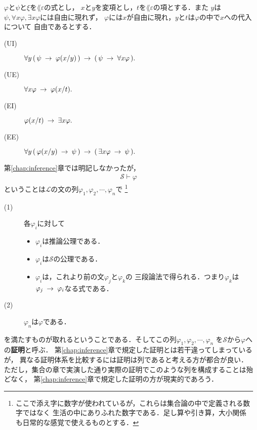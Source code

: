 	\begin{screen}
		\begin{logicalaxm}[{\bf HK}の公理(量化)]
			$\varphi$と$\psi$と$\xi$を$\lang{\varepsilon}$の式とし，
			$x$と$y$を変項とし，$t$を$\lang{\varepsilon}$の項とする．また
			$y$は$\psi,\forall x \varphi, \exists x \varphi$には自由に現れず，
			$\varphi$には$x$が自由に現れ，$y$と$t$は$\varphi$の中で$x$への代入について
			自由であるとする．
			\begin{description}
				\item[(UI)] $\forall y\, (\, \psi \hspace{0.25em}\rightarrow\hspace{0.25em} \varphi(x/y)\, ) 
					\hspace{0.25em}\rightarrow\hspace{0.25em} (\, \psi \hspace{0.25em}\rightarrow\hspace{0.25em} \forall x \varphi\, ).$
				
				\item[(UE)] $\forall x \varphi \hspace{0.25em}\rightarrow\hspace{0.25em} \varphi(x/t).$
				
				\item[(EI)] $\varphi(x/t) \hspace{0.25em}\rightarrow\hspace{0.25em} \exists x \varphi.$
				
				\item[(EE)] $\forall y\, (\, \varphi(x/y) \hspace{0.25em}\rightarrow\hspace{0.25em} \psi\, )
						\hspace{0.25em}\rightarrow\hspace{0.25em} (\, \exists x \varphi \hspace{0.25em}\rightarrow\hspace{0.25em} \psi\, ).$
			\end{description}
		\end{logicalaxm}
	\end{screen}
	
	第\ref{chap:inference}章では明記しなかったが，
	\begin{align}
		\mathscr{S} \vdash \varphi
	\end{align}
	ということは$\mathcal{L}$の文の列$\varphi_{1},\varphi_{2},\cdots,\varphi_{n}$で
	\footnote{
		ここで添え字に数字が使われているが，これらは集合論の中で定義される数字ではなく
		生活の中にありふれた数字である．足し算や引き算，大小関係も日常的な感覚で使えるものとする．
	}
	\begin{description}
		\item[(1)] 各$\varphi_{i}$に対して
			\begin{itemize}
				\item $\varphi_{i}$は推論公理である．
				\item $\varphi_{i}$は$\mathscr{S}$の公理である．
				\item $\varphi_{i}$は，これより前の文$\varphi_{j}$と$\varphi_{k}$の
					三段論法で得られる．つまり$\varphi_{k}$は
					$\varphi_{j} \hspace{0.25em}\rightarrow\hspace{0.25em} \varphi_{i}$なる式である．
			\end{itemize}
		
		\item[(2)] $\varphi_{n}$は$\varphi$である．
	\end{description}
	を満たすものが取れるということである．そしてこの列$\varphi_{1},\varphi_{2},\cdots,\varphi_{n}$
	を$\mathscr{S}$から$\varphi$への{\bf 証明}と呼ぶ．
	第\ref{chap:inference}章で規定した証明とは若干違ってしまっているが，
	異なる証明体系を比較するには証明は列であると考える方が都合が良い．
	ただし，集合の章で実演した通り実際の証明でこのような列を構成することは殆どなく，
	第\ref{chap:inference}章で規定した証明の方が現実的であろう．
	
